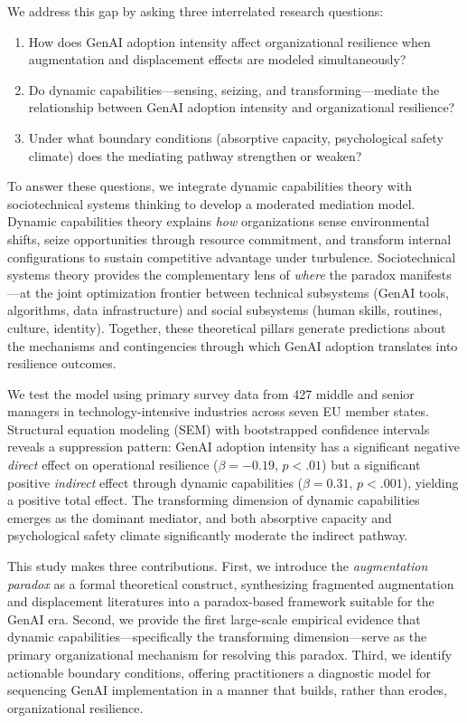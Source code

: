 \documentclass[12pt, a4paper]{article}
\begin{document}
We address this gap by asking three interrelated research questions:

\begin{enumerate}[label=\textbf{RQ\arabic*:}]
    \item How does GenAI adoption intensity affect organizational resilience when augmentation and displacement effects are modeled simultaneously?
    \item Do dynamic capabilities---sensing, seizing, and transforming---mediate the relationship between GenAI adoption intensity and organizational resilience?
    \item Under what boundary conditions (absorptive capacity, psychological safety climate) does the mediating pathway strengthen or weaken?
\end{enumerate}

To answer these questions, we integrate dynamic capabilities theory \citep{Teece2007, Teece2018} with sociotechnical systems thinking \citep{Trist1981, Baxter2011} to develop a moderated mediation model. Dynamic capabilities theory explains \textit{how} organizations sense environmental shifts, seize opportunities through resource commitment, and transform internal configurations to sustain competitive advantage under turbulence. Sociotechnical systems theory provides the complementary lens of \textit{where} the paradox manifests---at the joint optimization frontier between technical subsystems (GenAI tools, algorithms, data infrastructure) and social subsystems (human skills, routines, culture, identity). Together, these theoretical pillars generate predictions about the mechanisms and contingencies through which GenAI adoption translates into resilience outcomes.

We test the model using primary survey data from 427 middle and senior managers in technology-intensive industries across seven EU member states. Structural equation modeling (SEM) with bootstrapped confidence intervals reveals a suppression pattern: GenAI adoption intensity has a significant negative \textit{direct} effect on operational resilience ($\beta = -0.19$, $p < .01$) but a significant positive \textit{indirect} effect through dynamic capabilities ($\beta = 0.31$, $p < .001$), yielding a positive total effect. The transforming dimension of dynamic capabilities emerges as the dominant mediator, and both absorptive capacity and psychological safety climate significantly moderate the indirect pathway.

This study makes three contributions. First, we introduce the \textit{augmentation paradox} as a formal theoretical construct, synthesizing fragmented augmentation and displacement literatures into a paradox-based framework suitable for the GenAI era. Second, we provide the first large-scale empirical evidence that dynamic capabilities---specifically the transforming dimension---serve as the primary organizational mechanism for resolving this paradox. Third, we identify actionable boundary conditions, offering practitioners a diagnostic model for sequencing GenAI implementation in a manner that builds, rather than erodes, organizational resilience.
\end{document}
